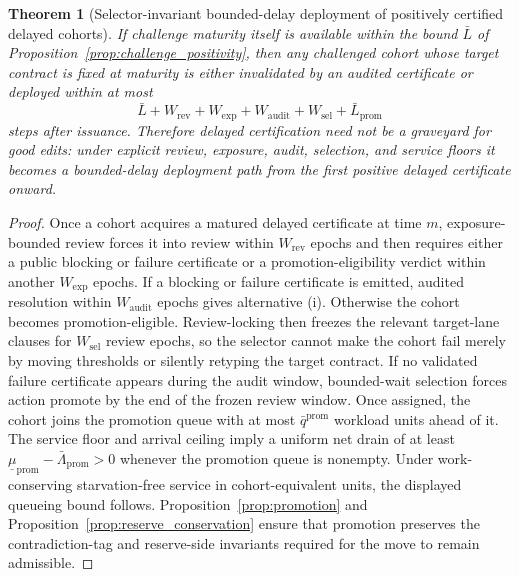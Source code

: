 \documentclass[11pt]{article}
\newtheorem{theorem}{Theorem}[section]
\theoremstyle{definition}
\newcommand{\1}{\mathbf{1}}
\begin{document}
\begin{theorem}[Selector-invariant bounded-delay deployment of positively certified delayed cohorts]
If challenge maturity itself is available within the bound $\bar L$ of Proposition~\ref{prop:challenge_positivity}, then any challenged cohort whose target contract is fixed at maturity is either invalidated by an audited certificate or deployed within at most
\[
\bar L+W_{\mathrm{rev}}+W_{\mathrm{exp}}+W_{\mathrm{audit}}+W_{\mathrm{sel}}+\bar L_{\mathrm{prom}}
\]
steps after issuance. Therefore delayed certification need not be a graveyard for good edits: under explicit review, exposure, audit, selection, and service floors it becomes a bounded-delay deployment path from the first positive delayed certificate onward.
\end{theorem}

\begin{proof}
Once a cohort acquires a matured delayed certificate at time $m$, exposure-bounded review forces it into review within $W_{\mathrm{rev}}$ epochs and then requires either a public blocking or failure certificate or a promotion-eligibility verdict within another $W_{\mathrm{exp}}$ epochs. If a blocking or failure certificate is emitted, audited resolution within $W_{\mathrm{audit}}$ epochs gives alternative (i). Otherwise the cohort becomes promotion-eligible. Review-locking then freezes the relevant target-lane clauses for $W_{\mathrm{sel}}$ review epochs, so the selector cannot make the cohort fail merely by moving thresholds or silently retyping the target contract. If no validated failure certificate appears during the audit window, bounded-wait selection forces action \textsf{promote} by the end of the frozen review window. Once assigned, the cohort joins the promotion queue with at most $\bar q^{\mathrm{prom}}$ workload units ahead of it. The service floor and arrival ceiling imply a uniform net drain of at least $\underline\mu_{\mathrm{prom}}-\bar\Lambda_{\mathrm{prom}}>0$ whenever the promotion queue is nonempty. Under work-conserving starvation-free service in cohort-equivalent units, the displayed queueing bound follows. Proposition~\ref{prop:promotion} and Proposition~\ref{prop:reserve_conservation} ensure that promotion preserves the contradiction-tag and reserve-side invariants required for the move to remain admissible.
\end{proof}
\end{document}
